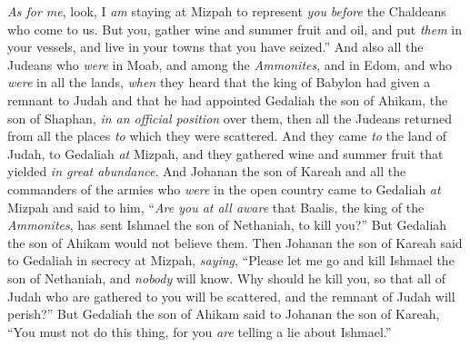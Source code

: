 \begin{biblechapter}
\verse \textit{As for me}, look, I \textit{am} staying at Mizpah to represent \textit{you} \textit{before} the Chaldeans who come to us. But you, gather wine and summer fruit and oil, and put \textit{them} in your vessels, and live in your towns that you have seized.”
\verse And also all the Judeans who \textit{were} in Moab, and among the \textit{Ammonites}, and in Edom, and who \textit{were} in all the lands, \textit{when} they heard that the king of Babylon had given a remnant to Judah and that he had appointed Gedaliah the son of Ahikam, the son of Shaphan, \textit{in an official position} over them,
\verse then all the Judeans returned from all the places \textit{to} which they were scattered. And they came \textit{to} the land of Judah, to Gedaliah \textit{at} Mizpah, and they gathered wine and summer fruit that yielded \textit{in great abundance}.
\verse And Johanan the son of Kareah and all the commanders of the armies who \textit{were} in the open country came to Gedaliah \textit{at} Mizpah
\verse and said to him, “\textit{Are you at all aware} that Baalis, the king of the \textit{Ammonites}, has sent Ishmael the son of Nethaniah, to kill you?” But Gedaliah the son of Ahikam would not believe them.
\verse Then Johanan the son of Kareah said to Gedaliah in secrecy at Mizpah, \textit{saying}, “Please let me go and kill Ishmael the son of Nethaniah, and \textit{nobody} will know. Why should he kill you, so that all of Judah who are gathered to you will be scattered, and the remnant of Judah will perish?”
\verse But Gedaliah the son of Ahikam said to Johanan the son of Kareah, “You must not do this thing, for you \textit{are} telling a lie about Ishmael.”
\end{biblechapter}

